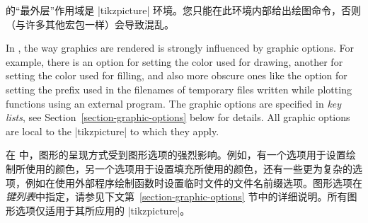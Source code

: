 \tikzname 的“最外层”作用域是 |{tikzpicture}| 环境。您只能在此环境内部给出绘图命令，否则（与许多其他宏包一样）会导致混乱。

In \tikzname, the way graphics are rendered is strongly influenced by graphic
options. For example, there is an option for setting the color used for
drawing, another for setting the color used for filling, and also more obscure
ones like the option  for setting the prefix used in the filenames of temporary
files written while plotting functions using an external program. The graphic
options are specified in \emph{key lists}, see
Section~\ref{section-graphic-options} below for details. All graphic options
are local to the |{tikzpicture}| to which they apply.

在 \tikzname 中，图形的呈现方式受到图形选项的强烈影响。例如，有一个选项用于设置绘制所使用的颜色，另一个选项用于设置填充所使用的颜色，还有一些更为复杂的选项，例如在使用外部程序绘制函数时设置临时文件的文件名前缀选项。图形选项在\emph{键列表}中指定，请参见下文第~\ref{section-graphic-options} 节中的详细说明。所有图形选项仅适用于其所应用的 |{tikzpicture}|。

